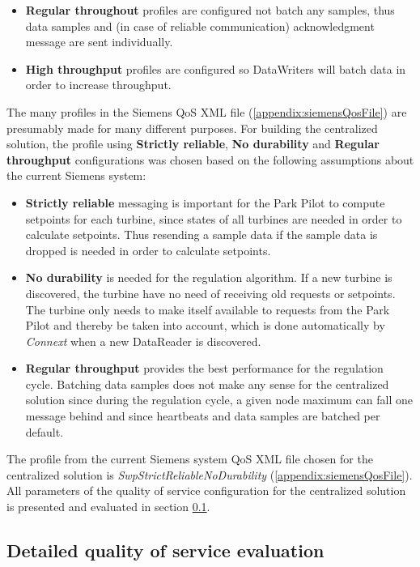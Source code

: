 \begin{itemize}
	\item \textbf{Regular throughout} profiles are configured not batch any samples, thus data samples and (in case of reliable communication) acknowledgment message are sent individually.
	\item \textbf{High throughput} profiles are configured so DataWriters will batch data in order to increase throughput.
\end{itemize}

The many profiles in the Siemens QoS XML file (\cref{appendix:siemensQosFile}) are presumably made for many different purposes. For building the centralized solution, the profile using \textbf{Strictly reliable}, \textbf{No durability} and \textbf{Regular throughput} configurations was chosen based on the following assumptions about the current Siemens system:

\begin{itemize}
	\item \textbf{Strictly reliable} messaging is important for the Park Pilot to compute setpoints for each turbine, since states of all turbines are needed in order to calculate setpoints. Thus resending a sample data if the sample data is dropped is needed in order to calculate setpoints. 
	\item \textbf{No durability} is needed for the regulation algorithm. If a new turbine is discovered, the turbine have no need of receiving old requests or setpoints. The turbine only needs to make itself available to requests from the Park Pilot and thereby be taken into account, which is done automatically by \textit{Connext} when a new DataReader is discovered.  
	\item \textbf{Regular throughput} provides the best performance for the regulation cycle. Batching data samples does not make any sense for the centralized solution since during the regulation cycle, a given node maximum can fall one message behind and since heartbeats and data samples are batched per default.
\end{itemize}

The profile from the current Siemens system QoS XML file chosen for the centralized solution is \textit{SwpStrictReliableNoDurability} (\cref{appendix:siemensQosFile}). All parameters of the quality of service configuration for the centralized solution is presented and evaluated in section \cref{sec:detailedQoSDesc}.


\subsection{Detailed quality of service evaluation} \label{sec:detailedQoSDesc}



